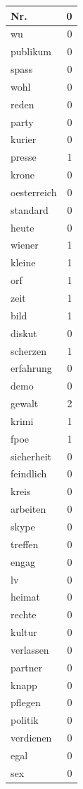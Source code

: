 \documentclass[]{article}
\begin{document}
\begin{longtable}{l|r}
\hline
Nr. & 0\\
\hline
wu & 0\\
\hline
publikum & 0\\
\hline
spass & 0\\
\hline
wohl & 0\\
\hline
reden & 0\\
\hline
party & 0\\
\hline
kurier & 0\\
\hline
presse & 1\\
\hline
krone & 0\\
\hline
oesterreich & 0\\
\hline
standard & 0\\
\hline
heute & 0\\
\hline
wiener & 1\\
\hline
kleine & 1\\
\hline
orf & 1\\
\hline
zeit & 1\\
\hline
bild & 1\\
\hline
diskut & 0\\
\hline
scherzen & 1\\
\hline
erfahrung & 0\\
\hline
demo & 0\\
\hline
gewalt & 2\\
\hline
krimi & 1\\
\hline
fpoe & 1\\
\hline
sicherheit & 0\\
\hline
feindlich & 0\\
\hline
kreis & 0\\
\hline
arbeiten & 0\\
\hline
skype & 0\\
\hline
treffen & 0\\
\hline
engag & 0\\
\hline
lv & 0\\
\hline
heimat & 0\\
\hline
rechte & 0\\
\hline
kultur & 0\\
\hline
verlassen & 0\\
\hline
partner & 0\\
\hline
knapp & 0\\
\hline
pflegen & 0\\
\hline
politik & 0\\
\hline
verdienen & 0\\
\hline
egal & 0\\
\hline
sex & 0\\
\hline
\end{longtable}
\end{document}
